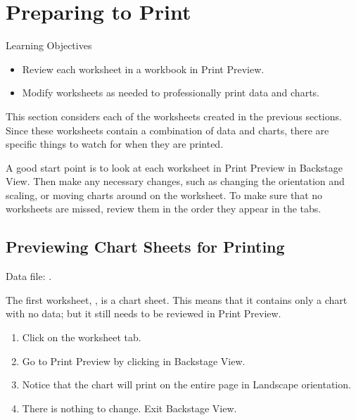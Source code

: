 \section{Preparing to Print}

\begin{center}
	\begin{objbox}{Learning Objectives}
		\begin{itemize}
			\setlength{\itemsep}{0pt}
			\setlength{\parskip}{0pt}
			\setlength{\parsep}{0pt}

			\item Review each worksheet in a workbook in Print Preview.
			\item Modify worksheets as needed to professionally print data and charts.
			
		\end{itemize}
	\end{objbox}
\end{center}

This section considers each of the worksheets created in the previous sections. Since these worksheets contain a combination of data and charts, there are specific things to watch for when they are printed.

A good start point is to look at each worksheet in Print Preview in Backstage View. Then make any necessary changes, such as changing the orientation and scaling, or moving charts around on the worksheet. To make sure that no worksheets are missed, review them in the order they appear in the tabs.

\subsection{Previewing Chart Sheets for Printing}

Data file: .

The first worksheet, , is a chart sheet. This means that it contains only a chart with no data; but it still needs to be reviewed in Print Preview.

\begin{enumerate}
	\item Click on the  worksheet tab.
	\item Go to Print Preview by clicking  in Backstage View.
	\item Notice that the chart will print on the entire page in Landscape orientation.
	\item There is nothing to change. Exit Backstage View.
\end{enumerate}

